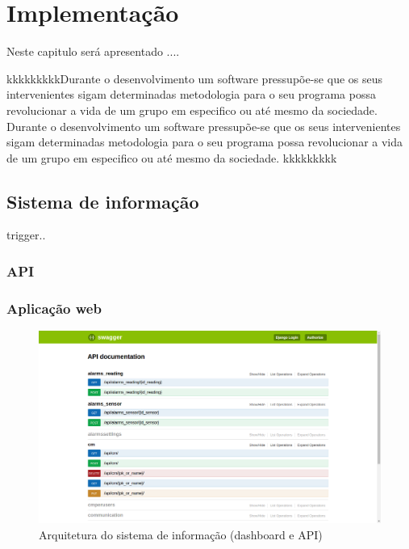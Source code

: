



\chapter{Implementação}
\label{implementacao}
Neste capitulo será apresentado ....

kkkkkkkkkDurante o desenvolvimento um software pressupõe-se que os seus intervenientes sigam determinadas metodologia para o seu programa possa revolucionar a vida de um grupo em especifico ou até mesmo da sociedade. 
Durante o desenvolvimento um software pressupõe-se que os seus intervenientes sigam determinadas metodologia para o seu programa possa revolucionar a vida de um grupo em especifico ou até mesmo da sociedade. kkkkkkkkk


















\section{Sistema de informação}


trigger..



\subsection{\ac{API}}

\subsection{Aplicação web}

\begin{figure}[h]
	\centering
	\includegraphics[width=\linewidth]{prints-web/api-doc.png}
	\caption{Arquitetura do sistema de informação (dashboard e API)}
	\label{docapi}
\end{figure}



